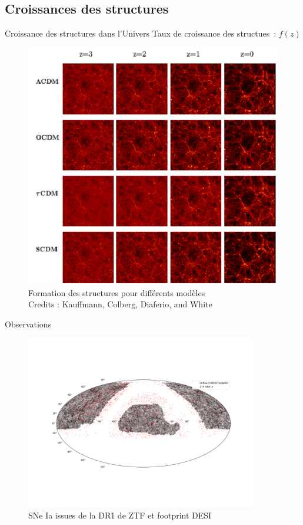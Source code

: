 \documentclass{beamer}
\newcommand{\credits}[1]{\tiny Credits : #1}
\begin{document}
\subsection{Croissances des structures}

\begin{frame}{Croissance des structures dans l'Univers}
	Taux de croissance des structues~: $f(z)$
	\begin{figure}
		\centering
		\includegraphics[height=0.6\textheight]{figures/struct_growth.png}
		\caption{Formation des structures pour différents modèles\\ \credits{Kauffmann, Colberg, Diaferio, and White}}
	\end{figure}
\end{frame}

\begin{frame}{Observations}
\begin{figure}
	\centering
	\includegraphics[width=0.9\textwidth, trim = {3cm, 5cm, 2cm, 5cm}, clip]{figures/ZTF_on_DESI.png}
	\caption{SNe Ia issues de la DR1 de ZTF et footprint DESI}
\end{figure}
\end{frame}
\end{document}
